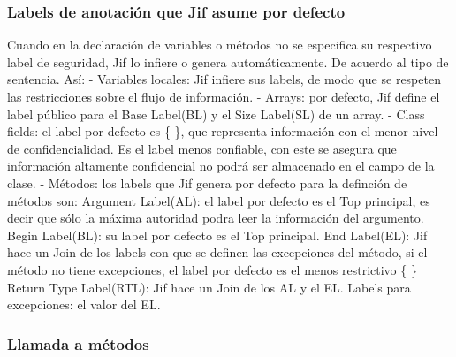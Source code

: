 \subsubsection{Labels de anotación que Jif asume por defecto}
\label{sssec:default-labels}
Cuando en la declaración de variables o métodos no se especifica su respectivo
label de seguridad, Jif lo infiere o genera automáticamente. De acuerdo al tipo
de sentencia. Así:\newline
- Variables locales: Jif infiere sus labels, de modo que se respeten las
restricciones sobre el flujo de información.\newline
- Arrays: por defecto, Jif define el label público para el Base Label(BL) y el
Size Label(SL) de un array.\newline
- Class fields: el label por defecto es \{ \}, que representa información con el
menor nivel de confidencialidad. Es el label menos confiable, con este se
asegura que información altamente confidencial no podrá ser almacenado en el
campo de la clase.\newline
- Métodos: los labels que Jif genera por defecto para la definción de
métodos son:\newline 
Argument Label(AL): el label por defecto es el Top principal, es decir que sólo
la máxima autoridad podra leer la información del argumento.\newline 
Begin Label(BL): su label por defecto es el Top principal.\newline
End Label(EL): Jif hace un Join de los labels con que se definen las
excepciones del método, si el método no tiene excepciones, el label por defecto
es el menos restrictivo \{ \}\newline
Return Type Label(RTL): Jif hace un Join de los AL y el EL.\newline
Labels para excepciones: el valor del EL.\newline
























\subsubsection{Llamada a métodos}